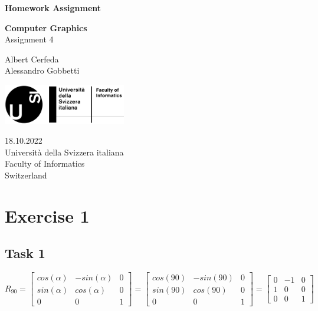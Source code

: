 \documentclass[tikz,14pt,fleqn]{article}
\newcommand\namesurname{Albert Cerfeda\\Alessandro Gobbetti}
\newcommand\assignment{Assignment 4}
\newcommand\subject{Computer Graphics}
\newcommand\documentdate{18.10.2022}
\begin{document}
\begin{titlepage}
   \begin{center}
       \vspace*{1cm}

       \textbf{\Large{Homework Assignment}}

       \vspace{0.5cm}
        \textbf{\subject}\\[5mm]
       \assignment
        
            
       \vspace{1.8cm}

        \namesurname
       \tableofcontents

       \vspace*{\fill}
     
       \includegraphics[width=0.4\textwidth]{fig/logo.png}
       
        \documentdate \\
        Università della Svizzera italiana\\
        Faculty of Informatics\\
        Switzerland\\

   \end{center}
\end{titlepage}



\section{Exercise 1}
\subsection{Task 1}
\[
R_{90} = 
\begin{bmatrix}
cos(\alpha) & -sin(\alpha) & 0\\
sin(\alpha) & cos(\alpha) & 0\\
0 & 0 & 1
\end{bmatrix} = 
\begin{bmatrix}
cos(90) & -sin(90) & 0\\
sin(90) & cos(90) & 0\\
0 & 0 & 1
\end{bmatrix} =
\begin{bmatrix}
0 & -1 & 0\\
1 & 0 & 0\\
0 & 0 & 1
\end{bmatrix}
\]
\end{document}
